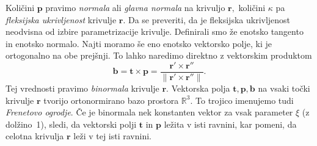 \documentclass[12pt,a4paper,twoside]{article}
\theoremstyle{definition} %
\theoremstyle{plain} %
\numberwithin{equation}{section}  %
\newcommand{\R}{\mathbb R}
\begin{document}
Količini $\mathbf{p}$ pravimo \textit{normala} ali \textit{glavna normala} na krivuljo $\mathbf{r},$ količini $\kappa$ pa \textit{fleksijska ukrivljenost} krivulje $\mathbf{r}.$ Da se preveriti, da je fleksijska ukrivljenost neodvisna od izbire parametrizacije krivulje.
Definirali smo že enotsko tangento in enotsko normalo. Najti moramo še eno enotsko vektorsko polje, ki je ortogonalno na obe prejšnji. To lahko naredimo direktno z vektorskim produktom
\begin{equation}
	\label{binormala}
	\mathbf{b}=\mathbf{t} \times \mathbf{p}=\frac{\mathbf{r'}\times \mathbf{r''}}{\lVert \mathbf{r'}\times \mathbf{r''} \rVert}.
\end{equation}
Tej vrednosti pravimo \textit{binormala} krivulje $\mathbf{r}.$ Vektorska polja $\mathbf{t},\mathbf{ p}, \mathbf{ b}$ na vsaki točki krivulje $\mathbf{r}$ tvorijo ortonormirano bazo prostora $\R^3.$ To trojico imenujemo tudi \textit{Frenetovo ogrodje}. Če je binormala nek konstanten vektor za vsak parameter $\xi$ (z dolžino~1), sledi, da vektorski polji $\mathbf{t}$ in $\mathbf{p}$ ležita v isti ravnini, kar pomeni, da celotna krivulja $\mathbf{r}$ leži v tej isti ravnini.
\end{document}
